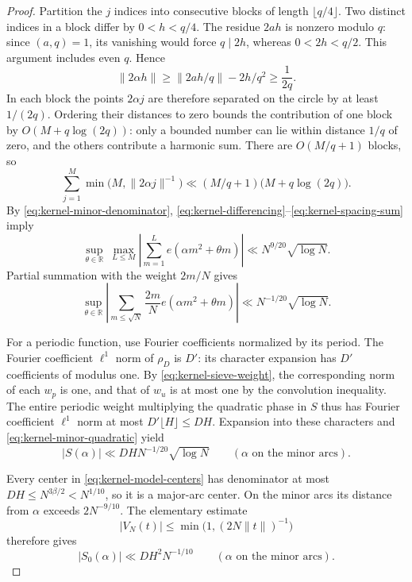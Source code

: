 \begin{proof}
Partition the $j$ indices into consecutive blocks of length
$\lfloor q/4\rfloor$. Two distinct indices in a block differ by
$0<h<q/4$. The residue $2ah$ is nonzero modulo $q$: since $(a,q)=1$,
its vanishing would force $q\mid2h$, whereas $0<2h<q/2$.
This argument includes even $q$. Hence
\[
 \|2\alpha h\|\ge\|2ah/q\|-2h/q^2\ge\frac1{2q}.
\]
In each block the points $2\alpha j$ are therefore separated on the
circle by at least $1/(2q)$. Ordering their distances to zero bounds
the contribution of one block by
$O(M+q\log(2q))$: only a bounded number can lie within distance
$1/q$ of zero, and the others contribute a harmonic sum.
There are $O(M/q+1)$ blocks, so
\begin{equation}
 \sum_{j=1}^M\min\bigl(M,\|2\alpha j\|^{-1}\bigr)
 \ll (M/q+1)\bigl(M+q\log(2q)\bigr).
 \label{eq:kernel-spacing-sum}
\end{equation}
By \eqref{eq:kernel-minor-denominator},
\eqref{eq:kernel-differencing}--\eqref{eq:kernel-spacing-sum} imply
\[
 \sup_{\theta\in\mathbb R}\ \max_{L\le M}
 \left|\sum_{m=1}^L e(\alpha m^2+\theta m)\right|
 \ll N^{9/20}\sqrt{\log N}.
\]
Partial summation with the weight $2m/N$ gives
\begin{equation}
 \sup_{\theta\in\mathbb R}
 \left|\sum_{m\le\sqrt N}\frac{2m}{N}
                    e(\alpha m^2+\theta m)\right|
 \ll N^{-1/20}\sqrt{\log N}.
 \label{eq:kernel-minor-quadratic}
\end{equation}

For a periodic function, use Fourier coefficients normalized by its
period. The Fourier coefficient $\ell^1$ norm of $\rho_D$ is $D'$:
its character expansion has $D'$ coefficients of modulus one.
By \eqref{eq:kernel-sieve-weight}, the corresponding norm of each
$w_p$ is one, and that of $w_u$ is at most one by the convolution
inequality. The entire periodic weight multiplying the quadratic
phase in $S$ thus has Fourier coefficient $\ell^1$ norm at most
$D'\lfloor H\rfloor\le DH$. Expansion into these characters and
\eqref{eq:kernel-minor-quadratic} yield
\begin{equation}
 |S(\alpha)|\ll DH N^{-1/20}\sqrt{\log N}
 \qquad(\alpha\text{ on the minor arcs}).
 \label{eq:kernel-minor-actual}
\end{equation}

Every center in \eqref{eq:kernel-model-centers} has denominator at
most $DH\le N^{3\beta/2}<N^{1/10}$, so it is a major-arc center.
On the minor arcs its distance from $\alpha$ exceeds $2N^{-9/10}$.
The elementary estimate
\[
 |V_N(t)|\le\min\bigl(1,(2N\|t\|)^{-1}\bigr)
\]
therefore gives
\begin{equation}
 |S_0(\alpha)|\ll DH^2N^{-1/10}
 \qquad(\alpha\text{ on the minor arcs}).
 \label{eq:kernel-minor-model}
\end{equation}


\end{proof}
